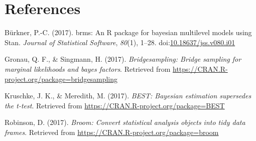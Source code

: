 \documentclass[floatsintext,doc]{apa6}
\begin{document}
\newpage

\hypertarget{references}{%
\section{References}\label{references}}

\setlength{\parindent}{-0.5in}
\setlength{\leftskip}{0.5in}
\setlength{\parskip}{8pt}

\noindent

\hypertarget{refs}{}
\leavevmode\hypertarget{ref-R-brms}{}%
Bürkner, P.-C. (2017). brms: An R package for bayesian multilevel models using Stan. \emph{Journal of Statistical Software}, \emph{80}(1), 1--28. doi:\href{https://doi.org/10.18637/jss.v080.i01}{10.18637/jss.v080.i01}

\leavevmode\hypertarget{ref-R-bridgesampling}{}%
Gronau, Q. F., \& Singmann, H. (2017). \emph{Bridgesampling: Bridge sampling for marginal likelihoods and bayes factors}. Retrieved from \url{https://CRAN.R-project.org/package=bridgesampling}

\leavevmode\hypertarget{ref-R-BEST}{}%
Kruschke, J. K., \& Meredith, M. (2017). \emph{BEST: Bayesian estimation supersedes the t-test}. Retrieved from \url{https://CRAN.R-project.org/package=BEST}

\leavevmode\hypertarget{ref-R-broom}{}%
Robinson, D. (2017). \emph{Broom: Convert statistical analysis objects into tidy data frames}. Retrieved from \url{https://CRAN.R-project.org/package=broom}
\end{document}
